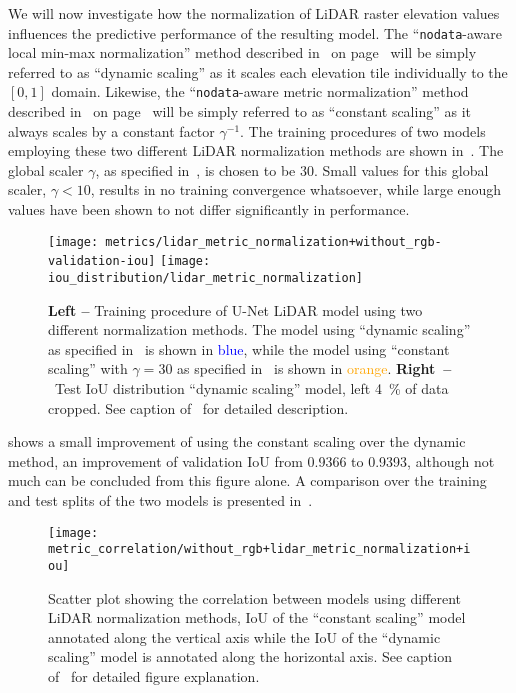 We will now investigate how the normalization of LiDAR raster elevation values influences the predictive performance of the resulting model.
The \enquote{\texttt{nodata}-aware local min-max normalization} method described in~ on page~\pageref{alg:local-min-max-scaling} will be simply referred to as \enquote{dynamic scaling} as it scales each elevation tile individually to the $[0, 1]$ domain.
Likewise, the \enquote{\texttt{nodata}-aware metric normalization} method described in~ on page~\pageref{alg:metric-normalization} will be simply referred to as \enquote{constant scaling} as it always scales by a constant factor $\gamma^{-1}$.
The training procedures of two models employing these two different LiDAR normalization methods are shown in~.
The global scaler $\gamma$, as specified in~, is chosen to be 30.
Small values for this global scaler, $\gamma < 10$, results in no training convergence whatsoever, while large enough values have been shown to not differ significantly in performance.

\begin{figure}[H]
  \centering
  \texttt{[image: metrics/lidar\_metric\_normalization+without\_rgb-validation-iou]}
  \texttt{[image: iou\_distribution/lidar\_metric\_normalization]}
  \caption{%
    \textbf{Left --} Training procedure of U-Net LiDAR model using two different normalization methods.
    The model using \enquote{dynamic scaling} as specified in~ is shown in \textcolor{blue}{blue}, while the model using \enquote{constant scaling} with $\gamma = 30$ as specified in~ is shown in \textcolor{orange}{orange}.
    \textbf{Right~--}~Test IoU distribution \enquote{dynamic scaling} model, left \SI{4}{\percent} of data cropped.
    See caption of~ for detailed description.
  }%
  \label{fig:normalization-training}
\end{figure}

 shows a small improvement of using the constant scaling over the dynamic method, an improvement of validation IoU from \num{0.9366} to \num{0.9393}, although not much can be concluded from this figure alone.
A comparison over the training and test splits of the two models is presented in~.

\begin{figure}[H]
  \centering
  \texttt{[image: metric\_correlation/without\_rgb+lidar\_metric\_normalization+iou]}
  \caption{%
    Scatter plot showing the correlation between models using different LiDAR normalization methods, IoU of the \enquote{constant scaling} model annotated along the vertical axis while the IoU of the \enquote{dynamic scaling} model is annotated along the horizontal axis.
    See caption of~ for detailed figure explanation.
  }%
  \label{fig:normalization-correlation}
\end{figure}

